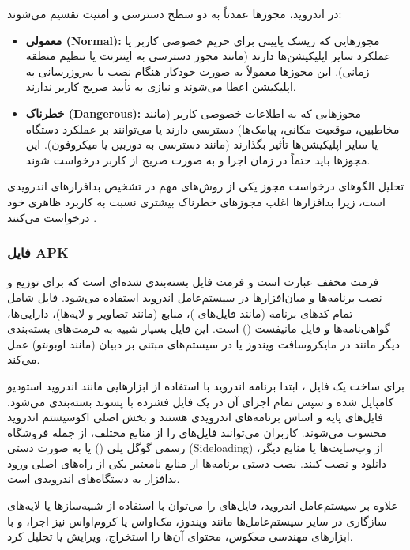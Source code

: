 در اندروید، مجوزها عمدتاً به دو سطح دسترسی و امنیت تقسیم می‌شوند:
\begin{itemize}
    \item \textbf{معمولی (Normal):} مجوزهایی که ریسک پایینی برای حریم خصوصی کاربر یا عملکرد سایر اپلیکیشن‌ها دارند (مانند مجوز دسترسی به اینترنت یا تنظیم منطقه زمانی). این مجوزها معمولاً به صورت خودکار هنگام نصب یا به‌روزرسانی به اپلیکیشن اعطا می‌شوند و نیازی به تأیید صریح کاربر ندارند.
    \item \textbf{خطرناک (Dangerous):} مجوزهایی که به اطلاعات خصوصی کاربر (مانند مخاطبین، موقعیت مکانی، پیامک‌ها) دسترسی دارند یا می‌توانند بر عملکرد دستگاه یا سایر اپلیکیشن‌ها تأثیر بگذارند (مانند دسترسی به دوربین یا میکروفون). این مجوزها باید حتماً در زمان اجرا و به صورت صریح از کاربر درخواست شوند.
\end{itemize}
تحلیل الگوهای درخواست مجوز یکی از روش‌های مهم در تشخیص بدافزارهای اندرویدی است، زیرا بدافزارها اغلب مجوزهای خطرناک بیشتری نسبت به کاربرد ظاهری خود درخواست می‌کنند \cite{Drebin}.

\subsubsection{فایل APK}
فرمت  مخفف عبارت  است و فرمت فایل بسته‌بندی شده‌ای است که برای توزیع و نصب برنامه‌ها و میان‌افزارها در سیستم‌عامل اندروید استفاده می‌شود. فایل  شامل تمام کدهای برنامه (مانند فایل‌های )، منابع (مانند تصاویر و لایه‌ها)، دارایی‌ها، گواهی‌نامه‌ها و فایل مانیفست () است. این فایل بسیار شبیه به فرمت‌های بسته‌بندی دیگر مانند  در مایکروسافت ویندوز یا  در سیستم‌های مبتنی بر دبیان (مانند اوبونتو) عمل می‌کند.

برای ساخت یک فایل ، ابتدا برنامه اندروید با استفاده از ابزارهایی مانند اندروید استودیو کامپایل شده و سپس تمام اجزای آن در یک فایل فشرده با پسوند  بسته‌بندی می‌شود. فایل‌های  پایه و اساس برنامه‌های اندرویدی هستند و بخش اصلی اکوسیستم اندروید محسوب می‌شوند. کاربران می‌توانند فایل‌های  را از منابع مختلف، از جمله فروشگاه رسمی گوگل پلی () یا به صورت دستی (Sideloading) از وب‌سایت‌ها یا منابع دیگر، دانلود و نصب کنند. نصب دستی برنامه‌ها از منابع نامعتبر یکی از راه‌های اصلی ورود بدافزار به دستگاه‌های اندرویدی است.

علاوه بر سیستم‌عامل اندروید، فایل‌های  را می‌توان با استفاده از شبیه‌سازها یا لایه‌های سازگاری در سایر سیستم‌عامل‌ها مانند ویندوز، مک‌اواس یا کروم‌اواس نیز اجرا، و با ابزارهای مهندسی معکوس، محتوای آن‌ها را استخراج، ویرایش یا تحلیل کرد.

